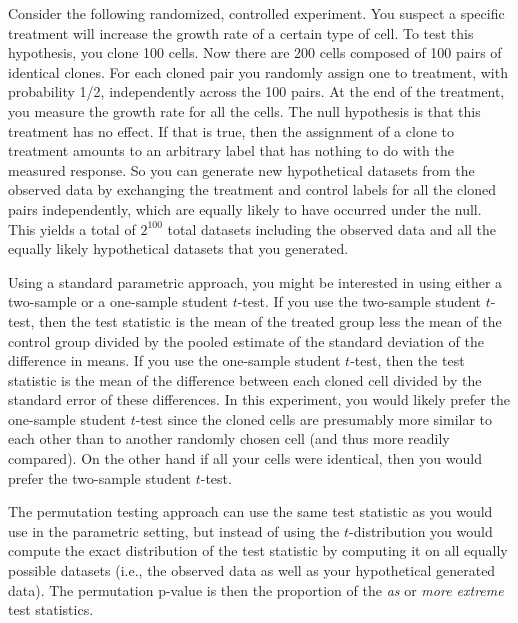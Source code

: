 \begin{example}[label=exa:cont] Consider the following randomized, controlled
experiment.  You suspect a specific treatment will increase the growth rate of
a certain type of cell.  To test this hypothesis, you clone 100 cells. Now
there are 200 cells composed of 100 pairs of identical clones. For each cloned
pair you randomly assign one to treatment, with probability 1/2, independently
across the 100 pairs.  At the end of the treatment, you measure the growth rate
for all the cells.  The null hypothesis is that this treatment has no effect.
If that is true, then the assignment of a clone to treatment amounts to an
arbitrary label that has nothing to do with the measured response.  So you can
generate new hypothetical datasets from the observed data by exchanging the
treatment and control labels for all the cloned pairs independently, which are
equally likely to have occurred under the null.  This yields a total of
$2^{100}$ total datasets including the observed data and all the equally likely
hypothetical datasets that you generated.

Using a standard parametric approach, you might be interested in using either a
two-sample or a one-sample student $t$-test.  If you use the two-sample student
$t$-test, then the test statistic is the mean of the treated group less the
mean of the control group divided by the pooled estimate of the standard
deviation of the difference in means.  If you use the one-sample student
$t$-test, then the test statistic is the mean of the difference between each
cloned cell divided by the standard error of these differences.  In this
experiment, you would likely prefer the one-sample student $t$-test since the
cloned cells are presumably more similar to each other than to another
randomly chosen cell (and thus more readily compared).  On the other hand if
all your cells were identical, then you would prefer the two-sample
student $t$-test.

The permutation testing approach can use the same test statistic as you would
use in the parametric setting, but instead of using the $t$-distribution you
would compute the exact distribution of the test statistic by computing it
on all equally possible datasets (i.e., the observed data as well as your
hypothetical generated data).  The permutation p-value is then the proportion
of the \emph{as} or \emph{more extreme} test statistics.
\end{example}

